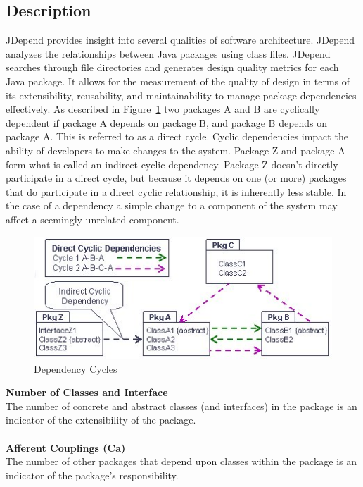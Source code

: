 \documentclass[12pt]{article}
\begin{document}
\subsection{Description}

JDepend provides insight into several qualities of software architecture. JDepend analyzes the relationships between Java packages using class files. JDepend searches through file directories and generates design quality metrics for each Java package. It allows for the measurement of the quality of design in terms of its extensibility, reusability, and maintainability to manage package dependencies effectively. As described in Figure~\ref{figure1} two packages A and B are cyclically dependent if package A depends on package B, and package B depends on package A. This is referred to as a direct cycle. Cyclic dependencies impact the ability of developers to make changes to the system. Package Z and package A form what is called an indirect cyclic dependency. Package Z doesn't directly participate in a direct cycle, but because it depends on one (or more) packages that do participate in a direct cyclic relationship, it is inherently less stable. In the case of a dependency a simple change to a component of the system may affect a seemingly unrelated component.\\

\begin{figure}
\center
\includegraphics[width=.6\textwidth]{figure2.jpg} 
\caption{Dependency Cycles}
\label{figure1}
\end{figure}

\textbf{Number of Classes and Interface}\\
The number of concrete and abstract classes (and interfaces) in the package is an indicator of the extensibility of the package.\\ \\

\textbf{Afferent Couplings (Ca)}\\
The number of other packages that depend upon classes within the package is an indicator of the package's responsibility.\\ \\
\end{document}
